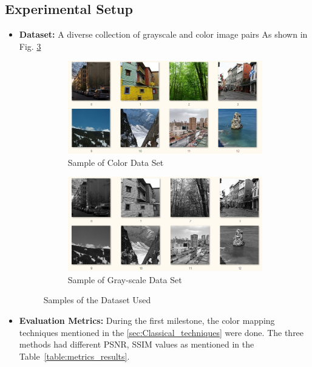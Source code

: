 \documentclass[conference]{IEEEtran}
\begin{document}
\subsection{Experimental Setup}
\begin{itemize}
\item \textbf{Dataset:} A diverse collection of grayscale and color image pairs As shown in Fig. \ref{fig:dataset_samples}

\begin{figure}[b]
    \centering
    \begin{subfigure}[b]{0.8\columnwidth}
        \centering
        \includegraphics[width=\linewidth]{dataset_color.png}
        \caption{Sample of Color Data Set}
        \label{fig:dataset_color}
    \end{subfigure}
    \quad
    \begin{subfigure}[b]{0.8\columnwidth}
        \centering
        \includegraphics[width=\linewidth]{dataset_gray.png}
        \caption{Sample of Gray-scale Data Set}
        \label{fig:dataset_gray}
    \end{subfigure}
    \caption{Samples of the Dataset Used}
    \label{fig:dataset_samples}
\end{figure}


\item \textbf{Evaluation Metrics:}
During the first milestone, the color mapping techniques mentioned in the \ref{sec:Classical_techniques} were done. The three methods had different PSNR, SSIM values as mentioned in the Table~\ref{table:metrics_results}.


\end{itemize}
\end{document}
